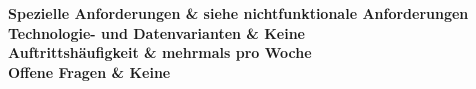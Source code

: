 \begin{longtabu}
	\bfseries Spezielle Anforderungen & siehe nichtfunktionale Anforderungen  \\\hline 
	\bfseries Technologie- und Datenvarianten & Keine  \\\hline 
	\bfseries Auftrittshäufigkeit & mehrmals pro Woche  \\\hline 
	\bfseries Offene Fragen & Keine  \\\hline  
\end{longtabu}
